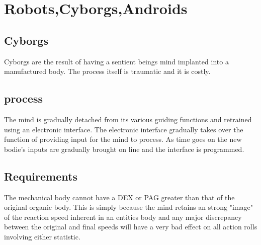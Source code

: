 \chapter{Robots,Cyborgs,Androids}

\section{Cyborgs}

Cyborgs are the result of having a sentient beings mind implanted 
into a manufactured body. The process itself is traumatic and it is 
costly. 

\section{process}

The mind is gradually detached from its various guiding functions and 
retrained using an electronic interface. The electronic interface 
gradually takes over the function of providing input for the mind to 
process. As time goes on the new bodie's inputs are gradually brought 
on line and the interface is programmed. 

\section{Requirements }

The mechanical body cannot have a DEX or PAG greater than that of the 
original organic body. This is simply because the mind retains an 
strong "image" of the reaction speed inherent in an entities body and 
any major discrepancy between the original and final speeds will have 
a very bad effect on all action rolls involving either statistic. 



